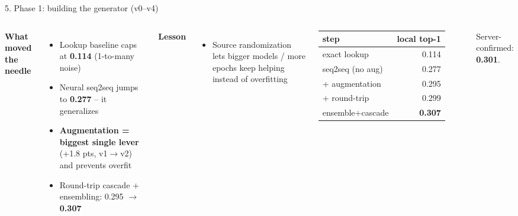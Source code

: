 \documentclass[aspectratio=169,11pt]{beamer}
\begin{document}
\begin{frame}{5. Phase 1: building the generator (v0--v4)}
  \begin{columns}[T,onlytextwidth]
    \textbf{What moved the needle}
    \begin{itemize}
      \item Lookup baseline caps at \textbf{0.114} (1-to-many noise)
      \item Neural seq2seq jumps to \textbf{0.277} -- it generalizes
      \item \textbf{Augmentation = biggest single lever} (+1.8 pts,
        v1$\to$v2) and prevents overfit
      \item Round-trip cascade + ensembling: 0.295 $\to$ \textbf{0.307}
    \end{itemize}

    \medskip
    \textbf{Lesson}
    \begin{itemize}
      \item Source randomization lets bigger models / more epochs keep
        helping instead of overfitting
    \end{itemize}

    \centering
    \footnotesize
    \begin{tabular}{lr}
      \toprule
      step & local top-1 \\
      \midrule
      exact lookup     & 0.114 \\
      seq2seq (no aug) & 0.277 \\
      + augmentation   & 0.295 \\
      + round-trip     & 0.299 \\
      ensemble+cascade & \textbf{0.307} \\
      \bottomrule
    \end{tabular}

    \medskip
    \footnotesize
    Server-confirmed: \textbf{0.301}.
  \end{columns}
\end{frame}
\end{document}
